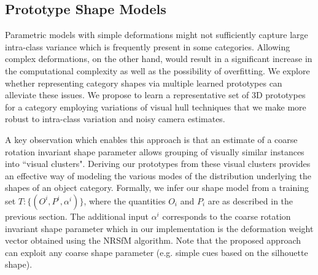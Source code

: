 \subsection{Prototype Shape Models}
\label{VH}

Parametric models with simple deformations might not sufficiently capture large intra-class variance which is frequently present in some categories. Allowing complex deformations, on the other hand, would result in a significant increase in the computational complexity as well as the possibility of overfitting. We explore whether representing category shapes via multiple learned prototypes can alleviate these issues. We propose to learn a representative set of 3D prototypes for a category employing variations of visual hull techniques that we make more robust to intra-class variation and noisy camera estimates.

A key observation which enables this approach is that an estimate of a coarse rotation invariant shape parameter allows grouping of visually similar instances into ``visual clusters". Deriving our prototypes from these visual clusters provides an effective way of modeling the various modes of the distribution underlying the shapes of an object category. Formally, we infer our shape model from a training set $T:\{(O^i,P^i,\alpha^i)\}$, where the quantities $O_i$ and $P_i$ are as described in the previous section. The additional input $\alpha^i$ corresponds to the coarse rotation invariant shape parameter which in our implementation is the deformation weight vector obtained using the NRSfM algorithm. Note that the proposed approach can exploit any coarse shape parameter (e.g. simple cues based on the silhouette shape).

